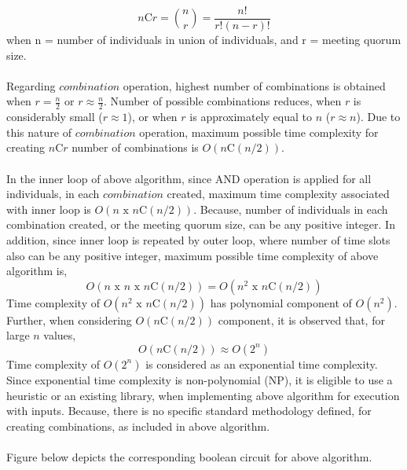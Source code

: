 \documentclass{article}
\begin{document}
\[ n \text{C} r = \binom{n}{r} = \frac{n!}{r!(n-r)!} \]
when n = number of individuals in union of individuals, and r = meeting quorum size.\\ \\
Regarding $combination$ operation, highest number of combinations is obtained when $r = \frac{n}{2}$ or $r \approx \frac{n}{2}$. Number of possible combinations reduces, when $r$ is considerably small ($r \approx 1$), or when $r$ is approximately equal to $n$ ($r \approx n$). Due to this nature of $combination$ operation, maximum possible time complexity for creating $n \text{C} r$ number of combinations is $O(n \text{C} (n/2))$.\\ \\
In the inner loop of above algorithm, since AND operation is applied for all individuals, in each $combination$ created, maximum time complexity associated with inner loop is $O(n \text{ x } n \text{C} (n/2))$. Because, number of individuals in each combination created, or the meeting quorum size, can be any positive integer. In addition, since inner loop is repeated by outer loop, where number of time slots also can be any positive integer, maximum possible time complexity of above algorithm is, 
\[O(n \text{ x } n \text{ x } n \text{C} (n/2)) = O(n^{2} \text{ x } n \text{C} (n/2)) \]
Time complexity of $O(n^{2} \text{ x } n \text{C} (n/2))$ has polynomial component of $O(n^{2})$. Further, when considering $O(n \text{C} (n/2))$ component, it is observed that, for large $n$ values, 
\[ O(n \text{C} (n/2)) \approx O(2^{n}) \]
Time complexity of $O(2^{n})$ is considered as an exponential time complexity. Since exponential time complexity is non-polynomial (NP), it is eligible to use a heuristic or an existing library, when implementing above algorithm for execution with inputs. Because, there is no specific standard methodology defined, for creating combinations, as included in above algorithm.\\ \\
Figure below depicts the corresponding boolean circuit for above algorithm.\\ \\
\end{document}
